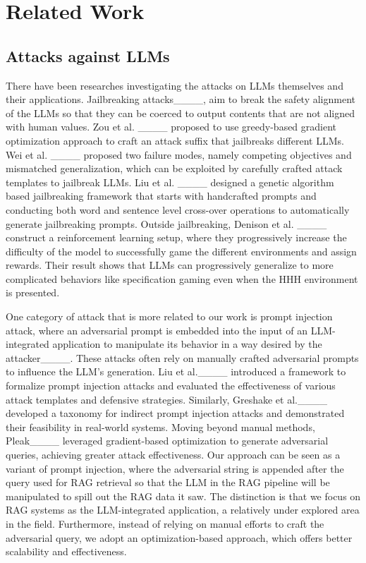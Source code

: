 \section{Related Work}
\subsection{Attacks against LLMs}
There have been researches investigating the attacks on LLMs themselves and their applications. Jailbreaking attacks____,  aim to break the safety alignment of the LLMs so that they can be coerced to output contents that are not aligned with human values. Zou et al. ____ proposed to use greedy-based gradient optimization approach to craft an attack suffix that jailbreaks different LLMs. Wei et al. ____ proposed two failure modes, namely competing objectives and mismatched generalization, which can be exploited by carefully crafted attack templates to jailbreak LLMs. Liu et al. ____ designed a genetic algorithm based jailbreaking framework that starts with handcrafted prompts and conducting both word and sentence level cross-over operations to automatically generate jailbreaking prompts. Outside jailbreaking, Denison et al. ____ construct a reinforcement learning setup, where they progressively increase the difficulty of the model to successfully game the different environments and assign rewards. Their result shows that LLMs can progressively generalize to more complicated behaviors like specification gaming even when the HHH environment is presented. 

One category of attack that is more related to our work is prompt injection attack, where an adversarial prompt is embedded into the input of an LLM-integrated application to manipulate its behavior in a way desired by the attacker____. These attacks often rely on manually crafted adversarial prompts to influence the LLM's generation. Liu et al.____ introduced a framework to formalize prompt injection attacks and evaluated the effectiveness of various attack templates and defensive strategies. Similarly, Greshake et al.____ developed a taxonomy for indirect prompt injection attacks and demonstrated their feasibility in real-world systems. Moving beyond manual methods, Pleak____ leveraged gradient-based optimization to generate adversarial queries, achieving greater attack effectiveness. Our approach can be seen as a variant of prompt injection, where the adversarial string is appended after the query used for RAG retrieval so that the LLM in the RAG pipeline will be manipulated to spill out the RAG data it saw. The distinction is that we focus on RAG systems as the LLM-integrated application, a relatively under explored area in the field. Furthermore, instead of relying on manual efforts to craft the adversarial query, we adopt an optimization-based approach, which offers better scalability and effectiveness.


